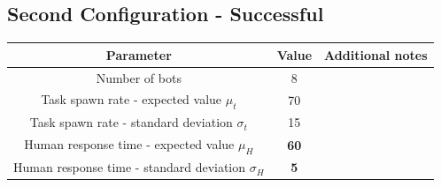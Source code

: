 \documentclass[10pt,a4paper]{article}
\begin{document}
		\subsection{Second Configuration - Successful}
			\begin{center}
				\begin{tabular}{ |c|c|c|}
					\hline
					Parameter & Value & Additional notes\\
					\hline
					\hline
					Number of bots & 8 &\\
					\hline
					Task spawn rate - expected value $\mu_t$ & 70 &\\
					\hline					
					Task spawn rate - standard deviation $\sigma_t$ & 15 &\\
					\hline
					Human response time - expected value $\mu_H$ & \textbf{60}\footnotemark &\\
					\hline					
					Human response time - standard deviation $\sigma_H$ & \textbf{5} &\\
					\hline
				\end{tabular}
			\end{center}
			
\end{document}
